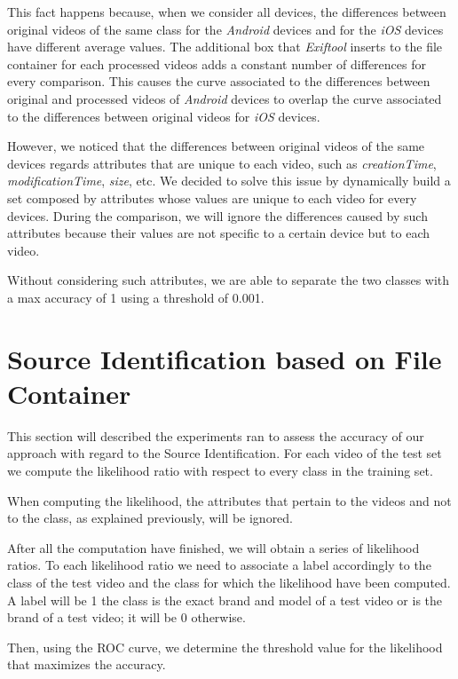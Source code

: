 This fact happens because, when we consider all devices, the differences between original videos of the same class for the \emph{Android} devices and for the \emph{iOS} devices have different average values. The additional box that \emph{Exiftool} inserts to the file container for each processed videos adds a constant number of differences for every comparison. This causes the curve associated to the differences between original and processed videos of \emph{Android} devices to overlap the curve associated to the differences between original videos for \emph{iOS} devices.

However, we noticed that the differences between original videos of the same devices regards attributes that are unique to each video, such as \emph{creationTime}, \emph{modificationTime}, \emph{size}, etc. We decided to solve this issue by dynamically build a set composed by attributes whose values are unique to each video for every devices. During the comparison, we will ignore the differences caused by such attributes because their values are not specific to a certain device but to each video.

Without considering such attributes, we are able to separate the two classes with a max accuracy of 1 using a threshold of 0.001.

\section{Source Identification based on File Container}

This section will described the experiments ran to assess the accuracy of our approach with regard to the Source Identification. For each video of the test set we compute the likelihood ratio with respect to every class in the training set. 

When computing the likelihood, the attributes that pertain to the videos and not to the class, as explained previously, will be ignored.

After all the computation have finished, we will obtain a series of likelihood ratios. To each likelihood ratio we need to associate a label accordingly to the class of the test video and the class for which the likelihood have been computed. A label will be 1 the class is the exact brand and model of a test video or is the brand of a test video; it will be 0 otherwise.

Then, using the ROC curve, we determine the threshold value for the likelihood that maximizes the accuracy.

